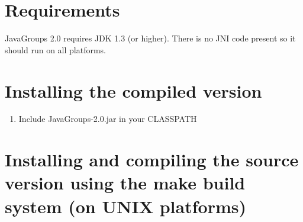   
  \section{Requirements}

  JavaGroups 2.0 requires JDK 1.3 (or higher). There is no JNI code present so it
  should run on all platforms.


  \section{Installing the compiled version}

  \begin{enumerate}
  \item Include JavaGroups-2.0.jar in your CLASSPATH 
  \end{enumerate}



  \section{Installing and compiling the source version using the make build system (on UNIX platforms)}

